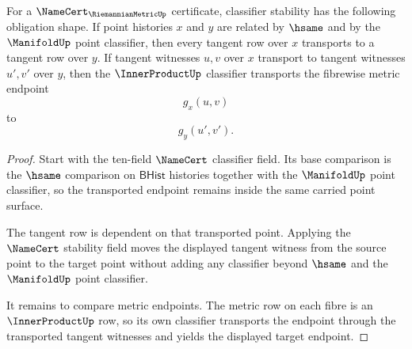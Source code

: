\begin{theorem}
\label{thm:riemannianmetric-classifier-stability-obligation}
For a $\NameCert_{\RiemannianMetricUp}$ certificate, classifier stability has
the following obligation shape. If point histories $x$ and $y$ are related by
$\hsame$ and by the $\ManifoldUp$ point classifier, then every tangent row over
$x$ transports to a tangent row over $y$. If tangent witnesses $u,v$ over $x$
transport to tangent witnesses $u',v'$ over $y$, then the $\InnerProductUp$
classifier transports the fibrewise metric endpoint
$$
g_x(u,v)
$$
to
$$
g_y(u',v').
$$
\end{theorem}
\begin{proof}
Start with the ten-field $\NameCert$ classifier field. Its base comparison is
the $\hsame$ comparison on $\mathsf{BHist}$ histories together with the
$\ManifoldUp$ point classifier, so the transported endpoint remains inside the
same carried point surface.

The tangent row is dependent on that transported point. Applying the
$\NameCert$ stability field moves the displayed tangent witness from the
source point to the target point without adding any classifier beyond
$\hsame$ and the $\ManifoldUp$ point classifier.

It remains to compare metric endpoints. The metric row on each fibre is an
$\InnerProductUp$ row, so its own classifier transports the endpoint through
the transported tangent witnesses and yields the displayed target endpoint.
\end{proof}

